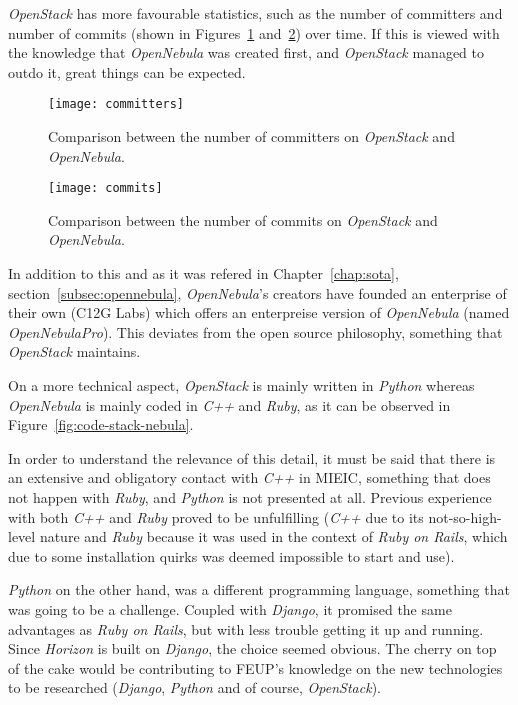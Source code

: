 \textit{OpenStack} has more favourable statistics, such as the number of committers and number of commits (shown in Figures~\ref{fig:committers} and~\ref{fig:commits}) over time. If this is viewed with the knowledge that \textit{OpenNebula} was created first, and \textit{OpenStack} managed to outdo it, great things can be expected.

\begin{figure}[h]
  \begin{center} 
    \leavevmode 
    \texttt{[image: committers]}
    \caption{Comparison between the number of committers on \textit{OpenStack} and \textit{OpenNebula}.~\cite{ohloh}} 
    \label{fig:committers} 
  \end{center}
\end{figure}

\begin{figure}[h]
  \begin{center}
    \leavevmode
    \texttt{[image: commits]}
    \caption{Comparison between the number of commits on \textit{OpenStack} and \textit{OpenNebula}.~\cite{ohloh}}
    \label{fig:commits}
  \end{center}
\end{figure}

In addition to this and as it was refered in Chapter~\ref{chap:sota}, section~\ref{subsec:opennebula}, \textit{OpenNebula}'s creators have founded an enterprise of their own (C12G Labs) which offers an enterpreise version of \textit{OpenNebula} (named \textit{OpenNebulaPro}). This deviates from the open source philosophy, something that \textit{OpenStack} maintains.

On a more technical aspect, \textit{OpenStack} is mainly written in \textit{Python} whereas \textit{OpenNebula} is mainly coded in \textit{C++} and \textit{Ruby}, as it can be observed in Figure~\ref{fig:code-stack-nebula}. 

In order to understand the relevance of this detail, it must be said that there is an extensive and obligatory contact with \textit{C++} in MIEIC, something that does not happen with \textit{Ruby}, and \textit{Python} is not presented at all. Previous experience with both \textit{C++} and \textit{Ruby} proved to be unfulfilling (\textit{C++} due to its not-so-high-level nature and \textit{Ruby} because it was used in the context of \textit{Ruby on Rails}, which due to some installation quirks was deemed impossible to start and use). 

\textit{Python} on the other hand, was a different programming language, something that was going to be a challenge. Coupled with \textit{Django}, it promised the same advantages as \textit{Ruby on Rails}, but with less trouble getting it up and running. Since \textit{Horizon} is built on \textit{Django}, the choice seemed obvious. The cherry on top of the cake would be contributing to FEUP's knowledge on the new technologies to be researched (\textit{Django}, \textit{Python} and of course, \textit{OpenStack}).

